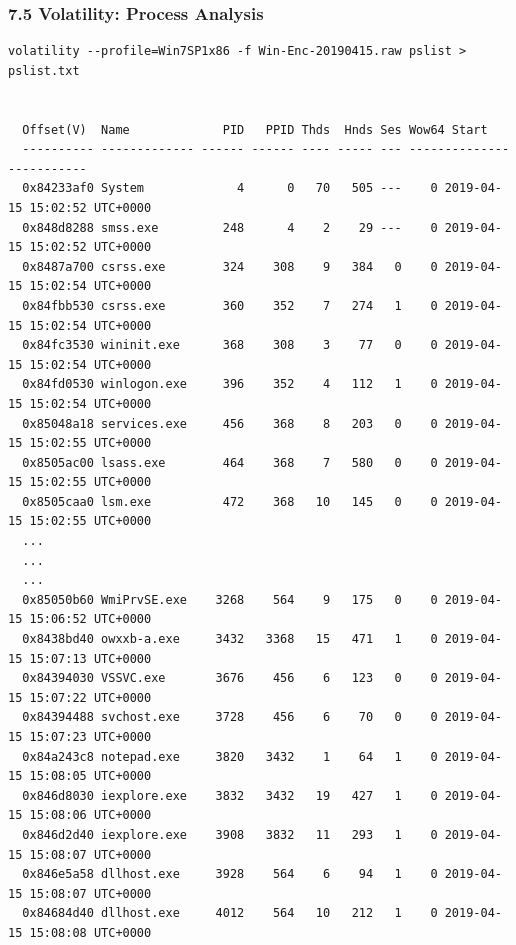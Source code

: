 \begin{frame}[fragile]
  \frametitle{7.5 Volatility: Process Analysis}
    \begin{lstlisting}[basicstyle=\tiny]
volatility --profile=Win7SP1x86 -f Win-Enc-20190415.raw pslist > pslist.txt


  Offset(V)  Name             PID   PPID Thds  Hnds Ses Wow64 Start          
  ---------- ------------- ------ ------ ---- ----- --- -------------------------
  0x84233af0 System             4      0   70   505 ---    0 2019-04-15 15:02:52 UTC+0000 
  0x848d8288 smss.exe         248      4    2    29 ---    0 2019-04-15 15:02:52 UTC+0000
  0x8487a700 csrss.exe        324    308    9   384   0    0 2019-04-15 15:02:54 UTC+0000
  0x84fbb530 csrss.exe        360    352    7   274   1    0 2019-04-15 15:02:54 UTC+0000
  0x84fc3530 wininit.exe      368    308    3    77   0    0 2019-04-15 15:02:54 UTC+0000
  0x84fd0530 winlogon.exe     396    352    4   112   1    0 2019-04-15 15:02:54 UTC+0000
  0x85048a18 services.exe     456    368    8   203   0    0 2019-04-15 15:02:55 UTC+0000
  0x8505ac00 lsass.exe        464    368    7   580   0    0 2019-04-15 15:02:55 UTC+0000
  0x8505caa0 lsm.exe          472    368   10   145   0    0 2019-04-15 15:02:55 UTC+0000
  ...
  ...
  ...
  0x85050b60 WmiPrvSE.exe    3268    564    9   175   0    0 2019-04-15 15:06:52 UTC+0000
  0x8438bd40 owxxb-a.exe     3432   3368   15   471   1    0 2019-04-15 15:07:13 UTC+0000
  0x84394030 VSSVC.exe       3676    456    6   123   0    0 2019-04-15 15:07:22 UTC+0000
  0x84394488 svchost.exe     3728    456    6    70   0    0 2019-04-15 15:07:23 UTC+0000
  0x84a243c8 notepad.exe     3820   3432    1    64   1    0 2019-04-15 15:08:05 UTC+0000
  0x846d8030 iexplore.exe    3832   3432   19   427   1    0 2019-04-15 15:08:06 UTC+0000
  0x846d2d40 iexplore.exe    3908   3832   11   293   1    0 2019-04-15 15:08:07 UTC+0000
  0x846e5a58 dllhost.exe     3928    564    6    94   1    0 2019-04-15 15:08:07 UTC+0000
  0x84684d40 dllhost.exe     4012    564   10   212   1    0 2019-04-15 15:08:08 UTC+0000
    \end{lstlisting}
\end{frame}


